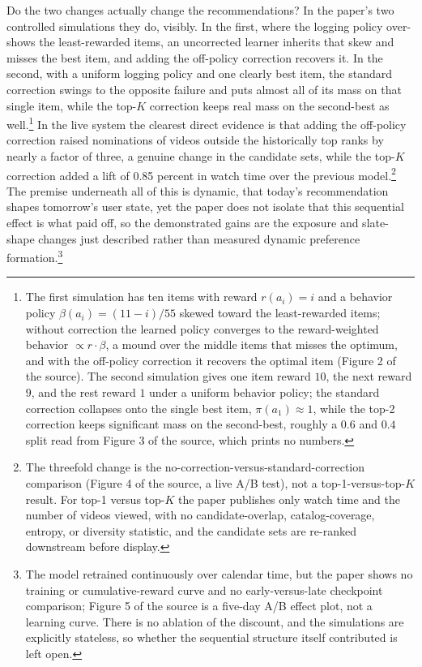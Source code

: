 Do the two changes actually change the recommendations? In the paper's two controlled simulations they do, visibly. In the first, where the logging policy over-shows the least-rewarded items, an uncorrected learner inherits that skew and misses the best item, and adding the off-policy correction recovers it. In the second, with a uniform logging policy and one clearly best item, the standard correction swings to the opposite failure and puts almost all of its mass on that single item, while the top-$K$ correction keeps real mass on the second-best as well.\footnote{The first simulation has ten items with reward $r(a_i) = i$ and a behavior policy $\beta(a_i) = (11-i)/55$ skewed toward the least-rewarded items; without correction the learned policy converges to the reward-weighted behavior $\propto r \cdot \beta$, a mound over the middle items that misses the optimum, and with the off-policy correction it recovers the optimal item (Figure 2 of the source). The second simulation gives one item reward $10$, the next reward $9$, and the rest reward $1$ under a uniform behavior policy; the standard correction collapses onto the single best item, $\pi(a_1) \approx 1$, while the top-2 correction keeps significant mass on the second-best, roughly a $0.6$ and $0.4$ split read from Figure 3 of the source, which prints no numbers.} In the live system the clearest direct evidence is that adding the off-policy correction raised nominations of videos outside the historically top ranks by nearly a factor of three, a genuine change in the candidate sets, while the top-$K$ correction added a lift of 0.85 percent in watch time over the previous model.\footnote{The threefold change is the no-correction-versus-standard-correction comparison (Figure 4 of the source, a live A/B test), not a top-1-versus-top-$K$ result. For top-1 versus top-$K$ the paper publishes only watch time and the number of videos viewed, with no candidate-overlap, catalog-coverage, entropy, or diversity statistic, and the candidate sets are re-ranked downstream before display.} The premise underneath all of this is dynamic, that today's recommendation shapes tomorrow's user state, yet the paper does not isolate that this sequential effect is what paid off, so the demonstrated gains are the exposure and slate-shape changes just described rather than measured dynamic preference formation.\footnote{The model retrained continuously over calendar time, but the paper shows no training or cumulative-reward curve and no early-versus-late checkpoint comparison; Figure 5 of the source is a five-day A/B effect plot, not a learning curve. There is no ablation of the discount, and the simulations are explicitly stateless, so whether the sequential structure itself contributed is left open.}


